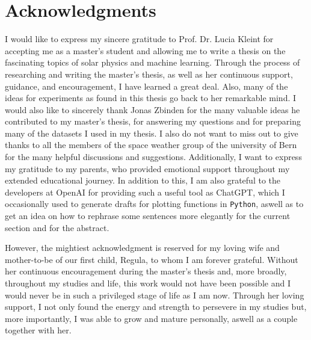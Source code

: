\documentclass[a4paper,12pt]{report}
\begin{document}

\chapter*{Acknowledgments}
I would like to express my sincere gratitude to Prof. Dr. Lucia Kleint for accepting me as a master's student and allowing me to write a thesis on the fascinating topics of solar physics and machine learning. Through the process of researching and writing the master's thesis, as well as her continuous support, guidance, and encouragement, I have learned a great deal. Also, many of the ideas for experiments as found in this thesis go back to her remarkable mind. I would also like to sincerely thank Jonas Zbinden for the many valuable ideas he contributed to my master's thesis, for answering my questions and for preparing many of the datasets I used in my thesis. I also do not want to miss out to give thanks to all the members of the space weather group of the university of Bern for the many helpful discussions and suggestions. Additionally, I want to express my gratitude to my parents, who provided emotional support throughout my extended educational journey. In addition to this, I am also grateful to the developers at OpenAI for providing such a useful tool as ChatGPT, which I occasionally used to generate drafts for plotting functions in \verb|Python|, aswell as to get an idea on how to rephrase some sentences more elegantly for the current section and for the abstract.

However, the mightiest acknowledgment is reserved for my loving wife and mother-to-be of our first child, Regula, to whom I am forever grateful. Without her continuous encouragement during the master's thesis and, more broadly, throughout my studies and life, this work would not have been possible and I would never be in such a privileged stage of life as I am now. Through her loving support, I not only found the energy and strength to persevere in my studies but, more importantly, I was able to grow and mature personally, aswell as a couple together with her.

\nocite{ChatGPT}



\end{document}

